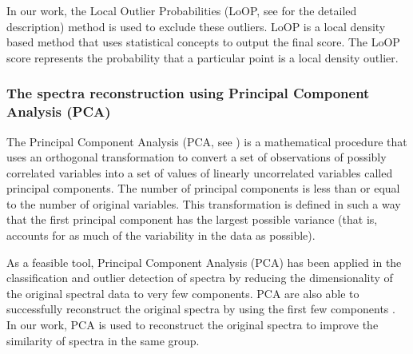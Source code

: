 \documentclass[manuscript]{aastex}
\begin{document}
In our work, the Local Outlier Probabilities (LoOP, see \cite{kriegel2009loop} for the detailed description) method is used to exclude these outliers.
LoOP is a local density based method that uses statistical concepts to output the final score.
The LoOP score represents the probability that a particular point is a local density outlier.



\subsubsection{The spectra reconstruction using Principal Component Analysis (PCA)}
The Principal Component Analysis  (PCA, see \cite{jolliffe2002principal}) is a mathematical procedure that uses an orthogonal transformation to convert a set of observations of possibly correlated variables into a set of values of linearly uncorrelated variables called principal components.
The number of principal components is less than or equal to the number of original variables.
This transformation is defined in such a way that the first principal component has the largest possible variance  (that is,  accounts for as much of the variability in the data as possible).

As a feasible tool, Principal Component Analysis (PCA) has been applied  in the classification and outlier detection of spectra \citep{whitney1983principal,bailer1998automated,yip2004spectral,tu2009new,tu2010method,almeida2013automated,wei2013mining,jiang2013data} by  reducing the dimensionality of the original spectral data to very few components.
PCA are also able to successfully reconstruct the original spectra by using the first few components \citep{singh1998stellar}.
In our work, PCA is used to reconstruct the original spectra to improve the similarity of spectra in the same group.
				
\end{document}
